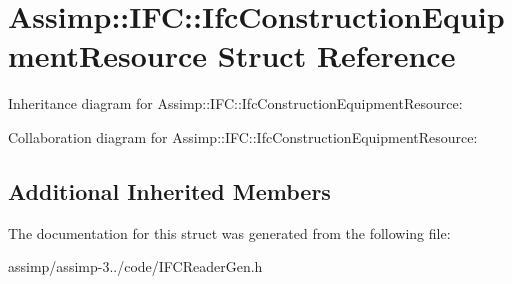 \hypertarget{struct_assimp_1_1_i_f_c_1_1_ifc_construction_equipment_resource}{\section{Assimp\+:\+:I\+F\+C\+:\+:Ifc\+Construction\+Equipment\+Resource Struct Reference}
\label{struct_assimp_1_1_i_f_c_1_1_ifc_construction_equipment_resource}
}


Inheritance diagram for Assimp\+:\+:I\+F\+C\+:\+:Ifc\+Construction\+Equipment\+Resource\+:


Collaboration diagram for Assimp\+:\+:I\+F\+C\+:\+:Ifc\+Construction\+Equipment\+Resource\+:
\subsection*{Additional Inherited Members}


The documentation for this struct was generated from the following file\+:\begin{DoxyCompactItemize}
\item 
assimp/assimp-\/3../code/I\+F\+C\+Reader\+Gen.\+h\end{DoxyCompactItemize}

